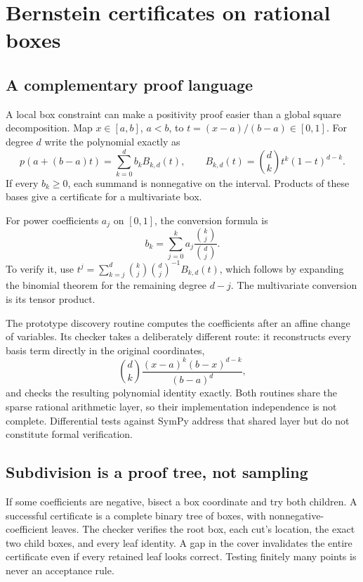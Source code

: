 \section{Bernstein certificates on rational boxes}

\subsection{A complementary proof language}

A local box constraint can make a positivity proof easier than a global
square decomposition. Map $x\in[a,b]$, $a<b$, to $t=(x-a)/(b-a)\in[0,1]$.
For degree $d$ write the polynomial exactly as
\[
 p(a+(b-a)t)=\sum_{k=0}^{d} b_k B_{k,d}(t),\qquad
 B_{k,d}(t)=\binom{d}{k}t^k(1-t)^{d-k}.
\]
If every $b_k\geq0$, each summand is nonnegative on the interval. Products of
these bases give a certificate for a multivariate box.

For power coefficients $a_j$ on $[0,1]$, the conversion formula is
\[
 b_k=\sum_{j=0}^{k}a_j\frac{\binom{k}{j}}{\binom{d}{j}}.
\]
To verify it, use
$t^j=\sum_{k=j}^{d}\binom{k}{j}\binom{d}{j}^{-1}B_{k,d}(t)$,
which follows by expanding the binomial theorem for the remaining degree
$d-j$. The multivariate conversion is its tensor product.

The prototype discovery routine computes the coefficients after an affine
change of variables. Its checker takes a deliberately different route:
it reconstructs every basis term directly in the original coordinates,
\[
 \binom{d}{k}\frac{(x-a)^k(b-x)^{d-k}}{(b-a)^d},
\]
and checks the resulting polynomial identity exactly. Both routines share the
sparse rational arithmetic layer, so their implementation independence is not
complete. Differential tests against SymPy address that shared layer but do
not constitute formal verification.

\subsection{Subdivision is a proof tree, not sampling}

If some coefficients are negative, bisect a box coordinate and try both
children. A successful certificate is a complete binary tree of boxes, with
nonnegative-coefficient leaves. The checker verifies the root box, each cut's
location, the exact two child boxes, and every leaf identity. A gap in the
cover invalidates the entire certificate even if every retained leaf looks
correct. Testing finitely many points is never an acceptance rule.

